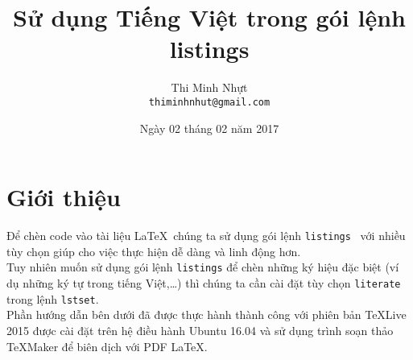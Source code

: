 \documentclass[12pt,a4paper]{article}
\title{\bfseries Sử dụng Tiếng Việt trong gói lệnh listings}
\author{Thi Minh Nhựt \bigskip \\ \tt thiminhnhut@gmail.com}
\date{Ngày 02 tháng 02 năm 2017}
\begin{document}
\maketitle
\tableofcontents




\section{Giới thiệu}
Để chèn code vào tài liệu \LaTeX\, chúng ta sử dụng gói lệnh \verb|listings|~\cite{listings-ctan} với nhiều tùy chọn giúp cho việc thực hiện dễ dàng và linh động hơn.\\

Tuy nhiên muốn sử dụng gói lệnh \verb|listings| để chèn những ký hiệu đặc biệt (ví dụ những ký tự trong tiếng Việt,\ldots) thì chúng ta cần cài đặt tùy chọn \verb|literate| trong lệnh \verb|lstset|.\\

Phần hướng dẫn bên dưới đã được thực hành thành công với phiên bản \TeX Live 2015 được cài đặt trên hệ điều hành Ubuntu 16.04 và sử dụng trình soạn thảo \TeX Maker để biên dịch với PDF \LaTeX. \\
\end{document}
